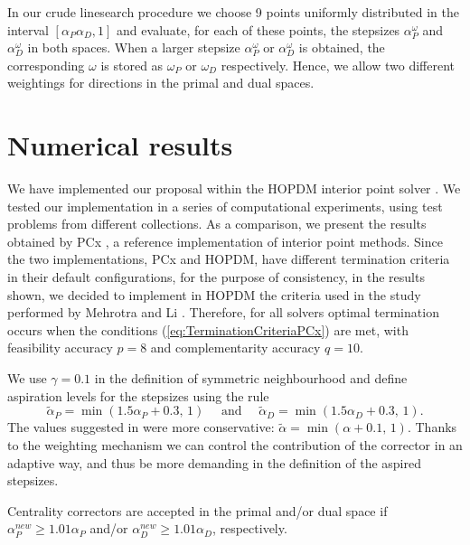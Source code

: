 In our crude linesearch procedure we choose 9 points uniformly 
distributed in the interval $[\alpha_P\alpha_D, 1]$ 
and evaluate, for each of these points, the stepsizes 
$\alpha^\omega_P$ and $\alpha^\omega_D$ in both spaces. 
When a larger stepsize $\alpha^\omega_P$ or $\alpha^\omega_D$ is obtained, 
the corresponding $\omega$ is stored as $\omega_P$ or $\omega_D$ 
respectively. Hence, we allow two different weightings for directions 
in the primal and dual spaces.

%
%
\section{Numerical results}
\label{NumRes}

We have implemented our proposal within the HOPDM interior point solver 
\cite{HOPDM}. 
%
%
We tested our implementation in a series of computational 
experiments, using test problems from different collections. 
As a comparison, we present the results obtained by PCx \cite{PCx}, 
a reference implementation of interior point methods. Since the two 
implementations, PCx and HOPDM, have different termination criteria 
in their default configurations, for the purpose of consistency,
in the results shown, 
we decided to implement in HOPDM the criteria used in the study 
performed by Mehrotra and Li \cite{MehrotraLi}.
Therefore, for all solvers optimal termination occurs when the conditions
(\ref{eq:TerminationCriteriaPCx}) are met, with feasibility
accuracy $p=8$ and complementarity accuracy $q = 10$.

We use $\gamma = 0.1$ in the definition of symmetric 
neighbourhood and define aspiration levels for the stepsizes using the rule
\[
  \tilde{\alpha}_{P} = \min(1.5 \alpha_{P} \! + \! 0.3, \, 1) 
  \quad \mbox{ and } \quad
  \tilde{\alpha}_{D} = \min(1.5 \alpha_{D} \! + \! 0.3, \, 1). 
\]
The values suggested in \cite{Gondzio96} were more conservative:
$\tilde{\alpha} = \min (\alpha + 0.1, \, 1)$.
Thanks to the weighting mechanism we can control 
the contribution of the corrector in an adaptive way,
and thus be more demanding in the definition of the aspired stepsizes.

Centrality correctors are accepted in the primal and/or dual space
if ${\alpha}_{P}^{new} \geq 1.01 \alpha_{P}$ 
and/or ${\alpha}_{D}^{new} \geq 1.01 \alpha_{D}$, respectively.

